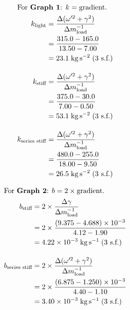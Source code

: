 \begin{strip}
\vspace{-4em}
\begin{multicols}{2}
\noindent
\begin{align*}
\intertext{For $\textbf{Graph 1}$: $k = \text{gradient}$.}
k_{\text{light}} &= \frac{\Delta (\omega'^2 + \gamma^2)}{\Delta m_{\text{load}}^{-1}} \\
&= \frac{315.0 - 165.0}{13.50 - 7.00} \\
&= 23.1 \; \si{\kilo\gram\per\second\squared} \; \text{(3 s.f.)} \\[1em]
k_{\text{stiff}} &= \frac{\Delta (\omega'^2 + \gamma^2)}{\Delta m_{\text{load}}^{-1}} \\
&= \frac{375.0 - 30.0}{7.00 - 0.50} \\
&= 53.1 \; \si{\kilo\gram\per\second\squared} \; \text{(3 s.f.)} \\[1em]
k_{\text{series stiff}} &= \frac{\Delta (\omega'^2 + \gamma^2)}{\Delta m_{\text{load}}^{-1}} \\
&= \frac{480.0 - 255.0}{18.00 - 9.50} \\
&= 26.5 \; \si{\kilo\gram\per\second\squared} \; \text{(3 s.f.)}
\end{align*}

\columnbreak

\noindent
\begin{align*}
\intertext{For $\textbf{Graph 2}$: $b = 2 \times \text{gradient}$.}
b_{\text{stiff}} &= 2 \times \frac{\Delta \gamma}{\Delta m_{\text{load}}^{-1}} \\
&= 2 \times \frac{\left(9.375 - 4.688 \right) \times 10^{-3}}{4.12 - 1.90} \\
&= 4.22 \times 10^{-3} \; \si{\kilo\gram\per\second} \; \text{(3 s.f.)} \\[1em]
b_{\text{series stiff}} &= 2 \times \frac{\Delta (\omega'^2 + \gamma^2)}{\Delta m_{\text{load}}^{-1}} \\
&= 2 \times \frac{\left(6.875 - 1.250 \right) \times 10^{-3}}{4.40 - 1.10} \\
&= 3.40 \times 10^{-3} \; \si{\kilo\gram\per\second} \; \text{(3 s.f.)}
\end{align*}
\end{multicols}
\end{strip}
\nopagebreak
